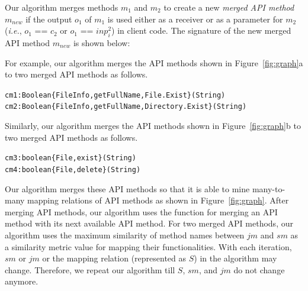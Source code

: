 



Our algorithm merges methods $m_1$ and $m_2$ to create a new \emph{merged API
method} $m_{new}$ if the output $o_1$ of $m_1$ is used either as a
receiver or as a parameter for $m_2$ (\emph{i.e.}, $o_1$ == $c_2$ or $o_1$
== $inp_i^2$) in client code. The signature of the new merged API
method $m_{new}$ is shown below:




For example, our algorithm merges the API methods shown in Figure~\ref{fig:graph}a to two merged API methods as follows.
\vspace*{-2ex}

\begin{CodeOut}
\begin{alltt}
cm1:Boolean \{FileInfo,getFullName,File.Exist\}(String)
cm2:Boolean \{FileInfo,getFullName,Directory.Exist\}(String)
\end{alltt}
\end{CodeOut}\vspace*{-2ex}

Similarly, our algorithm merges the API methods shown in Figure~\ref{fig:graph}b to two merged API methods as follows.
\vspace*{-2ex}

\begin{CodeOut}
\begin{alltt}
cm3:boolean \{File,exist\}(String)
cm4:boolean \{File,delete\}(String)
\end{alltt}
\end{CodeOut}\vspace*{-2ex}

Our algorithm merges these API methods so that it is able to mine many-to-many mapping relations of API methods as shown in Figure~\ref{fig:graph}. After merging API methods, our algorithm uses the  function for merging an API method with its next available API method. For two merged API methods, our algorithm uses the
maximum similarity of method names between $jm$ and $sm$ as a
similarity metric value for mapping their functionalities.
With each iteration, $sm$ or $jm$ or the mapping relation (represented as $S$)
in the algorithm may change. Therefore, we repeat our algorithm
till $S$, $sm$, and $jm$ do not change anymore.

